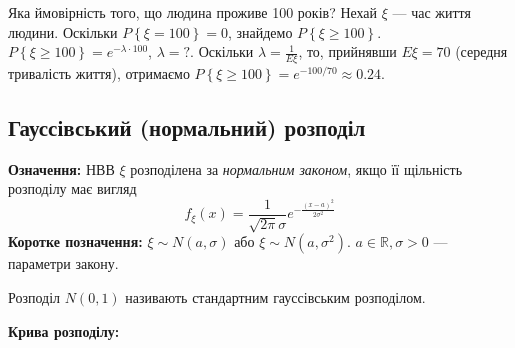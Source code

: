 \begin{example}
    Яка ймовірність того, що людина проживе 100 років? Нехай $\xi$ --- час життя людини.
    Оскільки $P\left\{\xi = 100\right\} = 0$, знайдемо $P\left\{ \xi \geq 100\right\}$.
    $P\left\{ \xi \geq 100\right\} = e^{-\lambda \cdot 100}$, $\lambda = \text{?}$.
    Оскільки $\lambda = \frac{1}{E\xi}$, то, прийнявши $E\xi = 70$ (середня тривалість життя),
    отримаємо $P\left\{ \xi \geq 100\right\} = e^{-100/70} \approx 0.24$.
\end{example}

\subsection{Гауссівський (нормальний) розподіл}
\noindent\textbf{Означення:}
    НВВ $\xi$ розподілена за \emph{нормальним законом}, 
    якщо її щільність розподілу має вигляд 
    \begin{equation}
        f_\xi(x) = \frac{1}{\sqrt{2\pi}\sigma} e^{-\frac{(x-a)^2}{2\sigma^2}}
    \end{equation}
\textbf{Коротке позначення:} $\xi \sim {N}(a, \sigma)$ або 
    $\xi \sim {N}(a, \sigma^2)$.
    $a \in \mathbb{R}, \sigma > 0$ --- параметри закону.

    Розподіл $N(0, 1)$ називають стандартним гауссівським розподілом.

\noindent \textbf{Крива розподілу:}


